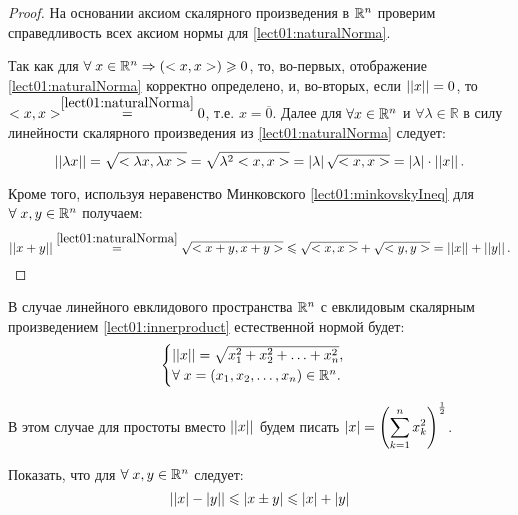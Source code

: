 \begin{proof}
    На основании аксиом скалярного произведения в $ \mathbb{R}^n $ проверим справедливость всех аксиом нормы для \eqref{lect01:naturalNorma}.
    
    Так как для $ \forall \; x \in \mathbb{R}^n \Rightarrow (<x,x>) \geqslant 0 $, то, во-первых, отображение \eqref{lect01:naturalNorma} корректно определено, и, во-вторых,
    если $ \left\lvert\left\lvert x\right\rvert\right\rvert = 0 $, то $ <x, x> \overset{\eqref{lect01:naturalNorma}}{=} 0$, т.е. $ x = \overline{0} $.
    Далее для $ \forall x \in \mathbb{R}^n $ и $ \forall \lambda \in \mathbb{R} $ в силу линейности скалярного произведения из \eqref{lect01:naturalNorma} следует:    
    \begin{equation*}
        \left\lvert\left\lvert\lambda x\right\rvert\right\rvert = \sqrt{< \lambda x, \lambda x >} = \sqrt{\lambda^2 < x, x >} = \left\lvert \lambda \right\rvert \sqrt{<x,x>} = \left\lvert \lambda \right\rvert \cdot \left\lvert\left\lvert x\right\rvert\right\rvert.
    \end{equation*}
    
    Кроме того, используя неравенство Минковского \eqref{lect01:minkovskyIneq} для $ \forall \; x, y \in \mathbb{R}^n $ получаем:
    \begin{equation*}
        \left\lvert\left\lvert x+y\right\rvert\right\rvert \overset{\eqref{lect01:naturalNorma}}{=} \sqrt{<x+y, x+y>} \leqslant \sqrt{<x,x>} + \sqrt{<y,y>} = \left\lvert\left\lvert x\right\rvert\right\rvert + \left\lvert\left\lvert y\right\rvert\right\rvert.
    \end{equation*}    
\end{proof}

\begin{note}
    В случае линейного евклидового пространства $ \mathbb{R}^n $ с евклидовым скалярным произведением \eqref{lect01:innerproduct} естественной нормой будет:
    \begin{equation*}
        \begin{cases}
        	\left\lvert\left\lvert x\right\rvert\right\rvert = \sqrt{x_1^2 + x_2^2 + \ldots + x_n^2}, \\        	
            \forall \; x = (x_1, x_2, \ldots, x_n) \in \mathbb{R}^n.
        \end{cases}
    \end{equation*}
\end{note}

В этом случае для простоты вместо $ \left\lvert\left\lvert x\right\rvert\right\rvert $ будем писать $ \left\lvert x \right\rvert = \left(\displaystyle\sum_{k=1}^{n} x_k^2\right)^{\frac{1}{2}} $.

\begin{exercise}
    Показать, что для $ \forall \;x, y \in \mathbb{R}^n $ следует:
    \begin{equation*}
    	\left\lvert \left\lvert x \right\rvert - \left\lvert y \right\rvert \right\rvert \leqslant \left\lvert x \pm y \right\rvert \leqslant \left\lvert x \right\rvert + \left\lvert y \right\rvert
    \end{equation*}
\end{exercise}


